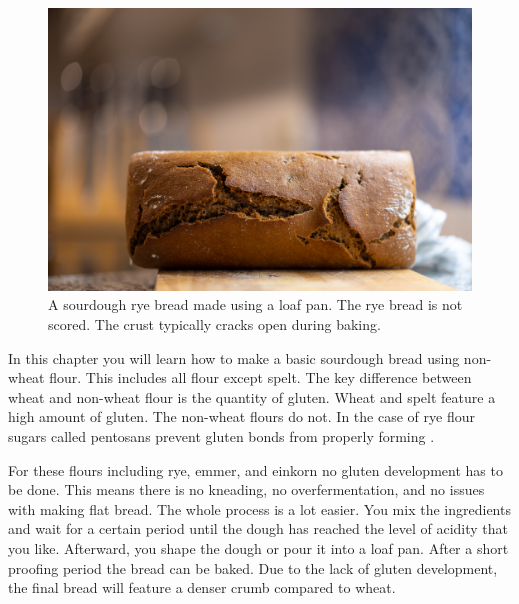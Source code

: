 \begin{figure}[!htb]
  \includegraphics[width=\textwidth]{final-bread}
  \caption{A sourdough rye bread made using a loaf pan. The
  rye bread is not scored. The crust typically cracks
  open during baking.}
  \label{fig:non-wheat-final-bread}
\end{figure}

In this chapter you will learn how to make a basic sourdough bread
using non-wheat flour. This includes all flour except spelt.
The key difference between wheat and non-wheat flour is
the quantity of gluten. Wheat and spelt feature a high amount
of gluten. The non-wheat flours do not. In the case of rye flour
sugars called pentosans prevent gluten bonds from properly
forming \cite{rye+pentosans}.

For these flours including rye, emmer, and einkorn no gluten
development has to be done. This means there is no kneading,
no overfermentation, and no issues with making flat bread.
The whole process
is a lot easier. You mix the ingredients and
wait for a certain period until the dough has
reached the level of acidity that you like. Afterward, you
shape the dough or pour it into a loaf pan. After a short proofing
period the bread can be baked. Due to the lack
of gluten development, the final bread will feature a denser
crumb compared to wheat.

